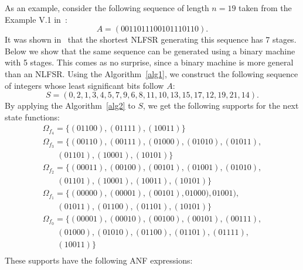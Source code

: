\documentclass[twocolumn]{IEEEtran} \usepackage{epsfig}
\begin{document}
As an example, consider the following sequence of length $n = 19$ taken from the Example V.1 in~\cite{LiKK07}:
\[
A = (0011011100101110110).
\]
It was shown in~\cite{LiKK07} that the shortest NLFSR generating this sequence has 7
stages. Below we show that the same sequence can be
generated using a binary machine with 5 stages. This comes as no surprise, since a binary machine is more general than an NLFSR. Using the Algorithm~\ref{alg1}, we construct the following sequence 
of integers whose least significant bits
follow $A$:
\[
S = (0,2,1,3,4,5,7,9,6,8,11,10,13,15,17,12,19,21,14).
\]
By applying the Algorithm~\ref{alg2} to $S$, we get the following supports for the next state functions:
\[
\begin{array}{l}
\Omega_{f_4} =  \{(01100),(01111),(10011)\}\\[1mm]
\Omega_{f_3}  =   \{(00110),(00111),(01000),(01010),(01011),\\
~~~~~~~~  (01101),(10001),(10101)\}\\[1mm]
\Omega_{f_2}  =   \{(00011),(00100),(00101),(01001),(01010),\\
~~~~~~~~  (01101),(10001),(10011),(10101)\}\\[1mm]
\Omega_{f_1}  =   \{(00000),(00001),(00101),01000),01001),\\
~~~~~~~~  (01011),(01100),(01101),(10101)\}\\[1mm]
\Omega_{f_0}  =   \{(00001),(00010),(00100),(00101),(00111),\\
~~~~~~~~ (01000),(01010),(01100),(01101),(01111),\\
~~~~~~~~ (10011)\}\\
\end{array}
\]
These supports have the following ANF expressions:
\end{document}
